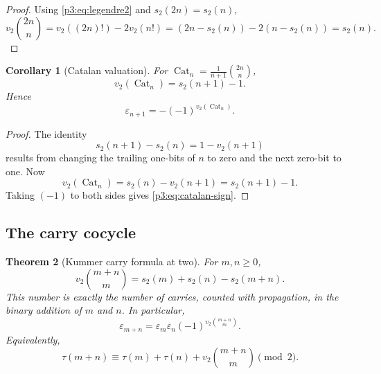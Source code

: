 \documentclass[11pt,oneside]{article}
\newtheorem{theorem}{Theorem}[section]
\newtheorem{corollary}[theorem]{Corollary}
\theoremstyle{definition}
\theoremstyle{remark}
\newcommand{\swt}{s_2}
\newcommand{\vtwo}{v_2}
\newcommand{\eps}{\varepsilon}
\newcommand{\Cat}{\operatorname{Cat}}
\newcommand{\1}{\mathbf 1}
\begin{document}
\begin{proof}
Using \eqref{p3:eq:legendre2} and \(\swt(2n)=\swt(n)\),
\[
 \vtwo\binom{2n}{n}
 =\vtwo((2n)!)-2\vtwo(n!)
 =(2n-\swt(n))-2(n-\swt(n))
 =\swt(n).
\]
\end{proof}

\begin{corollary}[Catalan valuation]
\label{p3:cor:catalan}
For \(\Cat_n=\frac1{n+1}\binom{2n}{n}\),
\begin{equation}
 \vtwo(\Cat_n)=\swt(n+1)-1.
 \label{p3:eq:catalan-v2}
\end{equation}
Hence
\begin{equation}
 \boxed{\eps_{n+1}=-(-1)^{\vtwo(\Cat_n)}}.
 \label{p3:eq:catalan-sign}
\end{equation}
\end{corollary}

\begin{proof}
The identity
\begin{equation}
 \swt(n+1)-\swt(n)=1-\vtwo(n+1)
 \label{p3:eq:successor-weight}
\end{equation}
results from changing the trailing one-bits of \(n\) to zero and the next zero-bit to one.
Now
\[
 \vtwo(\Cat_n)=\swt(n)-\vtwo(n+1)=\swt(n+1)-1.
\]
Taking \((-1)\) to both sides gives \eqref{p3:eq:catalan-sign}.
\end{proof}

\subsection{The carry cocycle}

\begin{theorem}[Kummer carry formula at two]
\label{p3:thm:carry}
For \(m,n\ge0\),
\begin{equation}
 \vtwo\binom{m+n}{m}
 =\swt(m)+\swt(n)-\swt(m+n).
 \label{p3:eq:carry-v2}
\end{equation}
This number is exactly the number of carries, counted with propagation, in the binary addition
of \(m\) and \(n\).  In particular,
\begin{equation}
 \boxed{
 \eps_{m+n}=\eps_m\eps_n(-1)^{\vtwo\binom{m+n}{m}}.}
 \label{p3:eq:carry-cocycle}
\end{equation}
Equivalently,
\begin{equation}
 \tau(m+n)\equiv
 \tau(m)+\tau(n)+\vtwo\binom{m+n}{m}\pmod2.
 \label{p3:eq:carry-bit}
\end{equation}
\end{theorem}
\end{document}
